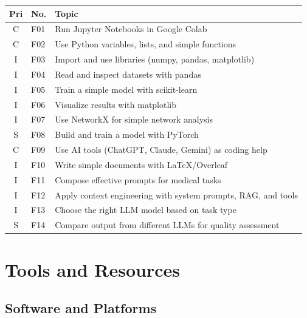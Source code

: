 \documentclass[11pt,a4paper]{article}
\begin{document}
\begin{longtable}{@{}clp{9cm}@{}}
\toprule
\textbf{Pri} & \textbf{No.} & \textbf{Topic} \\
\midrule
\endfirsthead
\midrule
\endhead
\midrule
\endfoot
\bottomrule
\endlastfoot
C & F01 & Run Jupyter Notebooks in Google Colab \\
C & F02 & Use Python variables, lists, and simple functions \\
I & F03 & Import and use libraries (numpy, pandas, matplotlib) \\
I & F04 & Read and inspect datasets with pandas \\
I & F05 & Train a simple model with scikit-learn \\
I & F06 & Visualize results with matplotlib \\
I & F07 & Use NetworkX for simple network analysis \\
S & F08 & Build and train a model with PyTorch \\
C & F09 & Use AI tools (ChatGPT, Claude, Gemini) as coding help \\
I & F10 & Write simple documents with LaTeX/Overleaf \\
I & F11 & Compose effective prompts for medical tasks \\
I & F12 & Apply context engineering with system prompts, RAG, and tools \\
I & F13 & Choose the right LLM model based on task type \\
S & F14 & Compare output from different LLMs for quality assessment \\
\end{longtable}

\section{Tools and Resources}

\subsection{Software and Platforms}
\end{document}
